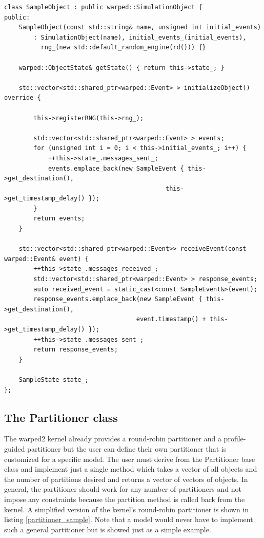 \documentclass[11pt]{book}
\begin{document}
\begin{lstlisting}[caption=Sample \textsc{warped2} Object Definition, label=object_sample, float]
class SampleObject : public warped::SimulationObject {
public:
    SampleObject(const std::string& name, unsigned int initial_events)
        : SimulationObject(name), initial_events_(initial_events),
          rng_(new std::default_random_engine(rd())) {}

    warped::ObjectState& getState() { return this->state_; }

    std::vector<std::shared_ptr<warped::Event> > initializeObject() override {

        this->registerRNG(this->rng_);

        std::vector<std::shared_ptr<warped::Event> > events;
        for (unsigned int i = 0; i < this->initial_events_; i++) {
            ++this->state_.messages_sent_;
            events.emplace_back(new SampleEvent { this->get_destination(),
                                            this->get_timestamp_delay() });
        }
        return events;
    }

    std::vector<std::shared_ptr<warped::Event>> receiveEvent(const warped::Event& event) {
        ++this->state_.messages_received_;
        std::vector<std::shared_ptr<warped::Event> > response_events;
        auto received_event = static_cast<const SampleEvent&>(event);
        response_events.emplace_back(new SampleEvent { this->get_destination(),
                                    event.timestamp() + this->get_timestamp_delay() });
        ++this->state_.messages_sent_;
        return response_events;
    }

    SampleState state_;
};
\end{lstlisting}

\subsection{The Partitioner class}

The warped2 kernel already provides a round-robin partitioner and a profile-guided partitioner but
the user can define their own partitioner that is customized for a specific model. The user must
derive from the Partitioner base class and implement just a single method which takes a vector of
all objects and the number of partitions desired and returns a vector of vectors of objects. In general,
the partitioner should work for any number of partitioners and not impose any constraints because
the partition method is called back from the kernel. A simplified version of the kernel's round-robin
partitioner is shown in listing \ref{partitioner_sample}. Note that a model would never have to
implement such a general partitioner but is showed just as a simple example.
\end{document}
